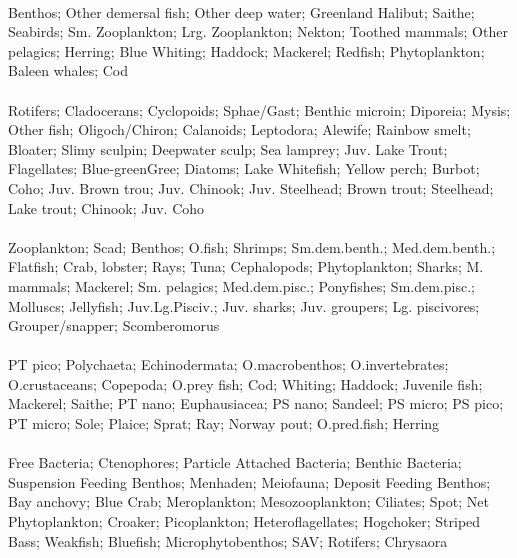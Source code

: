 \fullhline
\hline
{} \\
\hline
Benthos; Other demersal fish; Other deep water; Greenland Halibut; Saithe; Seabirds; Sm. Zooplankton; Lrg. Zooplankton; Nekton; Toothed mammals; Other pelagics; Herring; Blue Whiting; Haddock; Mackerel; Redfish; Phytoplankton; Baleen whales; Cod\\
\fullhline
\hline
{} \\
\hline
Rotifers; Cladocerans; Cyclopoids; Sphae/Gast; Benthic microin; Diporeia; Mysis; Other fish; Oligoch/Chiron; Calanoids; Leptodora; Alewife; Rainbow smelt; Bloater; Slimy sculpin; Deepwater sculp; Sea lamprey; Juv. Lake Trout; Flagellates; Blue-greenGree; Diatoms; Lake Whitefish; Yellow perch; Burbot; Coho; Juv. Brown trou; Juv. Chinook; Juv. Steelhead; Brown trout; Steelhead; Lake trout; Chinook; Juv. Coho\\
\fullhline
\hline
{} \\
\hline
Zooplankton; Scad; Benthos; O.fish; Shrimps; Sm.dem.benth.; Med.dem.benth.; Flatfish; Crab, lobster; Rays; Tuna; Cephalopods; Phytoplankton; Sharks; M. mammals; Mackerel; Sm. pelagics; Med.dem.pisc.; Ponyfishes; Sm.dem.pisc.; Molluscs; Jellyfish; Juv.Lg.Pisciv.; Juv. sharks; Juv. groupers; Lg. piscivores; Grouper/snapper; Scomberomorus\\
\fullhline
\hline
{} \\
\hline
PT pico; Polychaeta; Echinodermata; O.macrobenthos; O.invertebrates; O.crustaceans; Copepoda; O.prey fish; Cod; Whiting; Haddock; Juvenile fish; Mackerel; Saithe; PT nano; Euphausiacea; PS nano; Sandeel; PS micro; PS pico; PT micro; Sole; Plaice; Sprat; Ray; Norway pout; O.pred.fish; Herring\\
\fullhline
\hline
{} \\
\hline
Free Bacteria; Ctenophores; Particle Attached Bacteria; Benthic Bacteria; Suspension Feeding Benthos; Menhaden; Meiofauna; Deposit Feeding Benthos; Bay anchovy; Blue Crab; Meroplankton; Mesozooplankton; Ciliates; Spot; Net Phytoplankton; Croaker; Picoplankton; Heteroflagellates; Hogchoker; Striped Bass; Weakfish; Bluefish; Microphytobenthos; SAV; Rotifers; Chrysaora\\
\fullhline
\hline
{} \\
